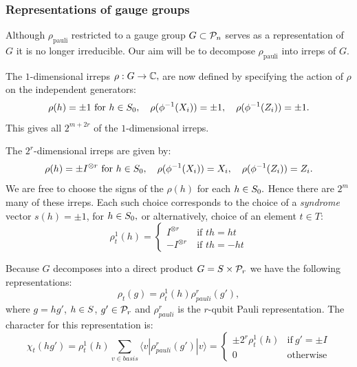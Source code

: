 \subsubsection{Representations of gauge groups}

Although $\rho_{\mathrm{pauli}}$
restricted to a gauge group $G\subset\mathcal{P}_n$ serves as a representation
of $G$ it is no longer irreducible.
Our aim will be to decompose $\rho_{\mathrm{pauli}}$ into irreps of $G.$

The $1$-dimensional irreps $\rho:G\to \mathbb{C},$
are now defined by
specifying the action of $\rho$ on the independent generators:
$$
    \rho(h)=\pm 1\ \mbox{for}\ h\in S_0,
    \quad \rho(\phi^{-1}(X_i)) = \pm 1,\quad \rho(\phi^{-1}(Z_i)) = \pm 1.
$$
This gives all $2^{m+2r}$ of the $1$-dimensional irreps.

The $2^r$-dimensional irreps are given by:
$$
    \rho(h) = \pm I^{\otimes r}\ \mbox{for}\ h\in S_0,
    \quad \rho(\phi^{-1}(X_i)) = X_i,\quad \rho(\phi^{-1}(Z_i)) = Z_i.
$$
We are free to choose the signs of the $\rho(h)$ for each $h\in S_0.$
Hence there are $2^m$ many of these irreps.
Each such choice corresponds to the choice of a {\it syndrome} vector $s(h)=\pm 1$, for $h \in S_0,$
or alternatively, choice of an element $t\in T:$
$$
    \rho^1_t(h) = \left\{ \begin{array}{ll}
 I^{\otimes r}\ &\mbox{if $th=ht$}\\
 -I^{\otimes r}\ &\mbox{if $th=-ht$}\end{array} \right. %
$$


Because $G$ decomposes 
into a direct product $G=S\times \mathcal{P}_r$ we have the
following representations:
$$
    \rho_t(g) = \rho^1_t(h) \rho^r_{pauli}(g'),
$$
where $g=hg'$, $h\in S$, $g'\in \mathcal{P}_r$ 
and $\rho^r_{pauli}$ is the $r$-qubit Pauli representation.
The character for this representation is:
$$
\chi_{t}(hg') = \rho_t^1(h) \sum_{v \in basis} \langle v | \rho^r_{{pauli}}(g') | v \rangle
    = \left\{ \begin{array}{ll}
 \pm 2^r\rho_t^1(h) &\mbox{if}\ g'=\pm I\\
 0 &\mbox{otherwise}\end{array}\right.
$$

